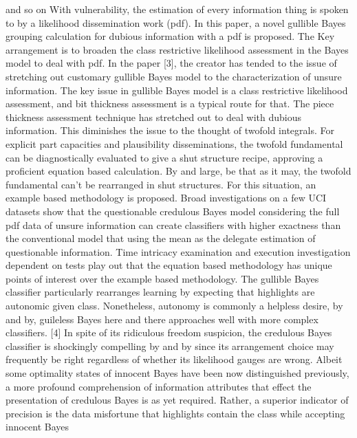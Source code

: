 \documentclass[letterpaper,12pt]{article}
\begin{document}
and so on With vulnerability, the estimation of every information thing is spoken to by a likelihood dissemination work (pdf). In this paper, a novel gullible Bayes grouping calculation for dubious information with a pdf is proposed. The Key arrangement is to broaden the class restrictive likelihood assessment in the Bayes model to deal with pdf. In the paper [3], the creator has tended to the issue of stretching out customary gullible Bayes model to the characterization of unsure information. The key issue in gullible Bayes model is a class restrictive likelihood assessment, and bit thickness assessment is a typical route for that. The piece thickness assessment technique has stretched out to deal with dubious information. This diminishes the issue to the thought of twofold integrals. For explicit part capacities and plausibility disseminations, the twofold fundamental can be diagnostically evaluated to give a shut structure recipe, approving a proficient equation based calculation. By and large, be that as it may, the twofold fundamental can't be rearranged in shut structures. For this situation, an example based methodology is proposed. Broad investigations on a few UCI datasets show that the questionable credulous Bayes model considering the full pdf data of unsure information can create classifiers with higher exactness than the conventional model that using the mean as the delegate estimation of questionable information. Time intricacy examination and execution investigation dependent on tests play out that the equation based methodology has unique points of interest over the example based methodology. The gullible Bayes classifier particularly rearranges learning by expecting that highlights are autonomic given class. Nonetheless, autonomy is commonly a helpless desire, by and by, guileless Bayes here and there approaches well with more complex classifiers. [4] In spite of its ridiculous freedom suspicion, the credulous Bayes classifier is shockingly compelling by and by since its arrangement choice may frequently be right regardless of whether its likelihood gauges are wrong. Albeit some optimality states of innocent Bayes have been now distinguished previously, a more profound comprehension of information attributes that effect the presentation of credulous Bayes is as yet required. Rather, a superior indicator of precision is the data misfortune that highlights contain the class while accepting innocent Bayes 
\end{document}
